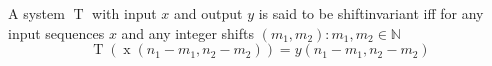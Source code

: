 A system $\operatorname{T}$ with input $x$ and output $y$ is said to be shiftinvariant iff for any input sequences $x$ and any integer shifts $(m_1, m_2) : m_1, m_2 \in \mathbb{N}$
$$\operatorname{T}(\operatorname{x}(n_1 - m_1, n_2 - m_2)) = y(n_1 - m_1, n_2 - m_2)$$
